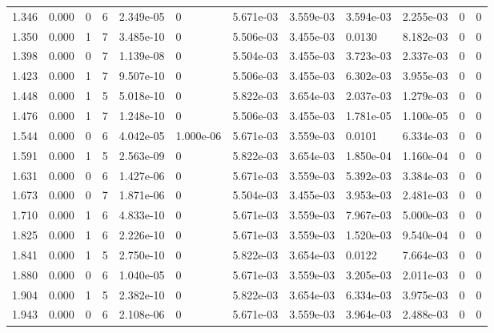 \documentclass[preview]{standalone}
\begin{document}
{{\begin{tabular}{L{1.2cm}C{1.2cm} C{0.3cm}C{0.5cm} C{1.4cm}C{1.4cm} C{1.4cm}C{1.4cm} C{1.6cm}C{1.6cm} C{1.6cm}C{1.6cm}}
  1.346  &  0.000  & 0     &  6 &  2.349e-05  & 0  &  5.671e-03&   3.559e-03& 3.594e-03 & 2.255e-03   &  0 & 0  \\ 
  1.350  &  0.000  & 1     &  7 &  3.485e-10  & 0  &  5.506e-03&   3.455e-03& 0.0130 & 8.182e-03   &  0 & 0  \\ 
  1.398  &  0.000  & 0     &  7 &  1.139e-08  & 0  &  5.504e-03&   3.455e-03& 3.723e-03 & 2.337e-03   &  0 & 0  \\ 
  1.423  &  0.000  & 1     &  7 &  9.507e-10  & 0  &  5.506e-03&   3.455e-03& 6.302e-03 & 3.955e-03   &  0 & 0  \\ 
  1.448  &  0.000  & 1     &  5 &  5.018e-10  & 0  &  5.822e-03&   3.654e-03& 2.037e-03 & 1.279e-03   &  0 & 0  \\ 
  1.476  &  0.000  & 1     &  7 &  1.248e-10  & 0  &  5.506e-03&   3.455e-03& 1.781e-05 & 1.100e-05   &  0 & 0  \\ 
  1.544  &  0.000  & 0     &  6 &  4.042e-05  & 1.000e-06  &  5.671e-03&   3.559e-03& 0.0101 & 6.334e-03   &  0 & 0  \\ 
  1.591  &  0.000  & 1     &  5 &  2.563e-09  & 0  &  5.822e-03&   3.654e-03& 1.850e-04 & 1.160e-04   &  0 & 0  \\ 
  1.631  &  0.000  & 0     &  6 &  1.427e-06  & 0  &  5.671e-03&   3.559e-03& 5.392e-03 & 3.384e-03   &  0 & 0  \\ 
  1.673  &  0.000  & 0     &  7 &  1.871e-06  & 0  &  5.504e-03&   3.455e-03& 3.953e-03 & 2.481e-03   &  0 & 0  \\ 
  1.710  &  0.000  & 1     &  6 &  4.833e-10  & 0  &  5.671e-03&   3.559e-03& 7.967e-03 & 5.000e-03   &  0 & 0  \\ 
  1.825  &  0.000  & 1     &  6 &  2.226e-10  & 0  &  5.671e-03&   3.559e-03& 1.520e-03 & 9.540e-04   &  0 & 0  \\ 
  1.841  &  0.000  & 1     &  5 &  2.750e-10  & 0  &  5.822e-03&   3.654e-03& 0.0122 & 7.664e-03   &  0 & 0  \\ 
  1.880  &  0.000  & 0     &  6 &  1.040e-05  & 0  &  5.671e-03&   3.559e-03& 3.205e-03 & 2.011e-03   &  0 & 0  \\ 
  1.904  &  0.000  & 1     &  5 &  2.382e-10  & 0  &  5.822e-03&   3.654e-03& 6.334e-03 & 3.975e-03   &  0 & 0  \\ 
  1.943  &  0.000  & 0     &  6 &  2.108e-06  & 0  &  5.671e-03&   3.559e-03& 3.964e-03 & 2.488e-03   &  0 & 0  \\ 
\hline 
\end{tabular} 

}}
\end{document}
